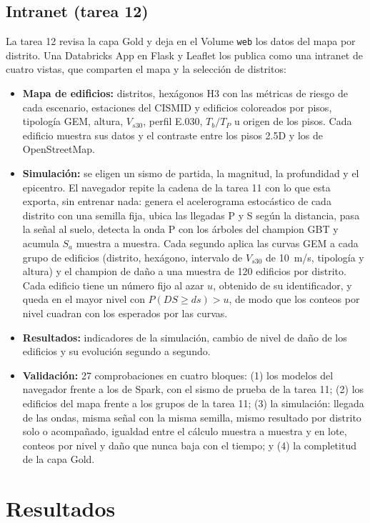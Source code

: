 \documentclass[conference]{IEEEtran}%
\newcommand{\vs}{V_{s30}}
\begin{document}
\subsection{Intranet (tarea 12)}\label{sec:intranet}
La tarea 12 revisa la capa Gold y deja en el Volume \texttt{web} los datos del mapa por distrito. Una Databricks App en Flask y Leaflet los publica como una intranet de cuatro vistas, que comparten el mapa y la selección de distritos:
\begin{itemize}
  \item \textbf{Mapa de edificios:} distritos, hexágonos H3 con las métricas de riesgo de cada escenario, estaciones del CISMID y edificios coloreados por pisos, tipología GEM, altura, $\vs$, perfil E.030, $T_b/T_P$ u origen de los pisos. Cada edificio muestra sus datos y el contraste entre los pisos 2.5D y los de OpenStreetMap.
  \item \textbf{Simulación:} se eligen un sismo de partida, la magnitud, la profundidad y el epicentro. El navegador repite la cadena de la tarea 11 con lo que esta exporta, sin entrenar nada: genera el acelerograma estocástico de cada distrito con una semilla fija, ubica las llegadas P y S según la distancia, pasa la señal al suelo, detecta la onda P con los árboles del champion GBT y acumula $S_a$ muestra a muestra. Cada segundo aplica las curvas GEM a cada grupo de edificios (distrito, hexágono, intervalo de $\vs$ de 10~m/s, tipología y altura) y el champion de daño a una muestra de 120 edificios por distrito. Cada edificio tiene un número fijo al azar $u$, obtenido de su identificador, y queda en el mayor nivel con $P(DS\geq ds)>u$, de modo que los conteos por nivel cuadran con los esperados por las curvas.
  \item \textbf{Resultados:} indicadores de la simulación, cambio de nivel de daño de los edificios y su evolución segundo a segundo.
  \item \textbf{Validación:} 27 comprobaciones en cuatro bloques: (1) los modelos del navegador frente a los de Spark, con el sismo de prueba de la tarea 11; (2) los edificios del mapa frente a los grupos de la tarea 11; (3) la simulación: llegada de las ondas, misma señal con la misma semilla, mismo resultado por distrito solo o acompañado, igualdad entre el cálculo muestra a muestra y en lote, conteos por nivel y daño que nunca baja con el tiempo; y (4) la completitud de la capa Gold.
\end{itemize}

\section{Resultados}\label{sec:resultados}
\end{document}
